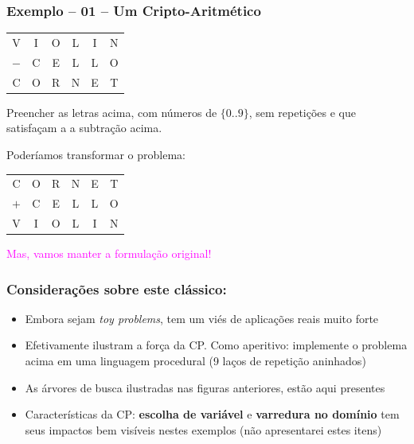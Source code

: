 \documentclass{beamer}
\begin{document}
\begin{frame}[fragile] 

\frametitle{Exemplo -- 01 -- Um Cripto-Aritmético}


\begin{center}
\begin{tabular}{cccccc}
V & I & O & L & I & N \\
  $-$ & C & E & L & L & O \\ \hline
C & O & R & N & E & T 
\end{tabular}
\end{center}
Preencher as letras acima, com números de $\{0..9\}$, sem repetições e que satisfaçam a a subtração  acima.
\vfill

\pause
Poderíamos transformar o problema:
\begin{center}
\begin{tabular}{cccccc}
C & O & R & N & E & T \\
 $+$ & C & E & L & L & O \\ \hline
V & I & O & L & I & N 
\end{tabular}
\end{center}

\textcolor{magenta}{Mas, vamos manter a formulação original!}

\end{frame}
\begin{frame}[fragile] 

\frametitle{Considerações sobre este clássico:}

\begin{itemize}
    \item Embora sejam {\em toy problems}, tem um viés de aplicações reais muito forte
    
    \item Efetivamente ilustram a força da CP. Como aperitivo: implemente o problema acima em uma linguagem procedural (9 laços de repetição aninhados)
    
    \item As árvores de busca ilustradas nas figuras anteriores, estão aqui presentes
    
    \item Características da CP: {\bf escolha de variável} e {\bf varredura no domínio} tem seus impactos bem visíveis nestes exemplos
    (não apresentarei estes itens)
    
\end{itemize}

\end{frame}
\end{document}
